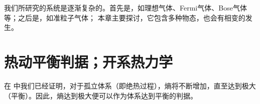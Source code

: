 
我们所研究的系统是逐渐复杂的。首先是，如理想气体、Fermi气体、Bose气体等；之后是，如准粒子气体；%
本章主要探讨，它包含多种物态，也会有相变的发生。

\section{热动平衡判据；开系热力学}
	在 中我们已经证明，对于孤立体系（即绝热过程），熵将不断增加，直至达到极大（平衡）。因此，熵达到极大便可以作为体系达到平衡的判据。
	
